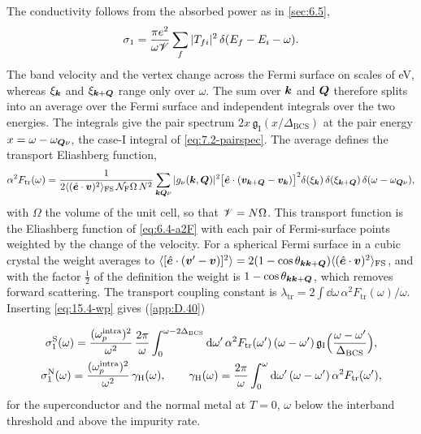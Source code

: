 The conductivity follows from the absorbed power as in \cref{sec:6.5},
\begin{equation*}
  \sigma_1 = \frac{\pi e^2}{\omega\mathscr{V}}\sum_f|T_{fi}|^2\,\delta(E_f - E_i - \omega) .
\end{equation*}
The band velocity and the vertex change across the Fermi surface on scales of eV, whereas $\xi_{\bm{k}}$ and $\xi_{\bm{k}+\bm{Q}}$ range only over $\omega$. The sum over $\bm{k}$ and $\bm{Q}$ therefore splits into an average over the Fermi surface and independent integrals over the two energies. The integrals give the pair spectrum $2x\,\mathfrak{g}_{\mathrm{I}}(x/\Delta_{\mathrm{BCS}})$ at the pair energy $x = \omega - \omega_{\bm{Q}\nu}$, the case-I integral of \cref{eq:7.2-pairspec}. The average defines the transport Eliashberg function,
\begin{equation}
  \alpha^2F_{\mathrm{tr}}(\omega) = \frac{1}{2\langle(\hat{\bm{e}}\cdot\bm{v})^2\rangle_{\mathrm{FS}}\,\mathcal{N}_{\mathrm{F}}\Omega\,N^2}\sum_{\bm{k}\bm{Q}\nu}|g_\nu(\bm{k},\bm{Q})|^2\bigl[\hat{\bm{e}}\cdot(\bm{v}_{\bm{k}+\bm{Q}} - \bm{v}_{\bm{k}})\bigr]^2\delta(\xi_{\bm{k}})\,\delta(\xi_{\bm{k}+\bm{Q}})\,\delta(\omega - \omega_{\bm{Q}\nu}) ,
  \label{eq:15.4-a2Ftr}
\end{equation}
with $\Omega$ the volume of the unit cell, so that $\mathscr{V} = N\Omega$. This transport function is the Eliashberg function of \cref{eq:6.4-a2F} with each pair of Fermi-surface points weighted by the change of the velocity. For a spherical Fermi surface in a cubic crystal the weight averages to $\langle[\hat{\bm{e}}\cdot(\bm{v}' - \bm{v})]^2\rangle = 2(1 - \cos\theta_{\bm{k}\bm{k}+\bm{Q}})\langle(\hat{\bm{e}}\cdot\bm{v})^2\rangle_{\mathrm{FS}}$, and with the factor $\frac12$ of the definition the weight is $1 - \cos\theta_{\bm{k}\bm{k}+\bm{Q}}$, which removes forward scattering. The transport coupling constant is $\lambda_{\mathrm{tr}} = 2\int\dd\omega\,\alpha^2F_{\mathrm{tr}}(\omega)/\omega$. Inserting \cref{eq:15.4-wp} gives (\cref{app:D.40})
\begin{keyresult}
\begin{equation}
  \begin{gathered}
  \sigma_1^{\mathrm{S}}(\omega) = \frac{(\omega_p^{\mathrm{intra}})^2}{\omega^2}\,\frac{2\pi}{\omega}\int_0^{\omega - 2\Delta_{\mathrm{BCS}}}\mathrm{d}\omega'\,\alpha^2F_{\mathrm{tr}}(\omega')\,(\omega - \omega')\,\mathfrak{g}_{\mathrm{I}}\Bigl(\frac{\omega - \omega'}{\Delta_{\mathrm{BCS}}}\Bigr) , \\
  \sigma_1^{\mathrm{N}}(\omega) = \frac{(\omega_p^{\mathrm{intra}})^2}{\omega^2}\,\gamma_{\mathrm{H}}(\omega), \qquad
  \gamma_{\mathrm{H}}(\omega) = \frac{2\pi}{\omega}\int_0^{\omega}\mathrm{d}\omega'\,(\omega - \omega')\,\alpha^2F_{\mathrm{tr}}(\omega') ,
  \end{gathered}
  \label{eq:15.4-holstein}
\end{equation}
for the superconductor and the normal metal at $T = 0$, $\omega$ below the interband threshold and above the impurity rate.
\end{keyresult}
